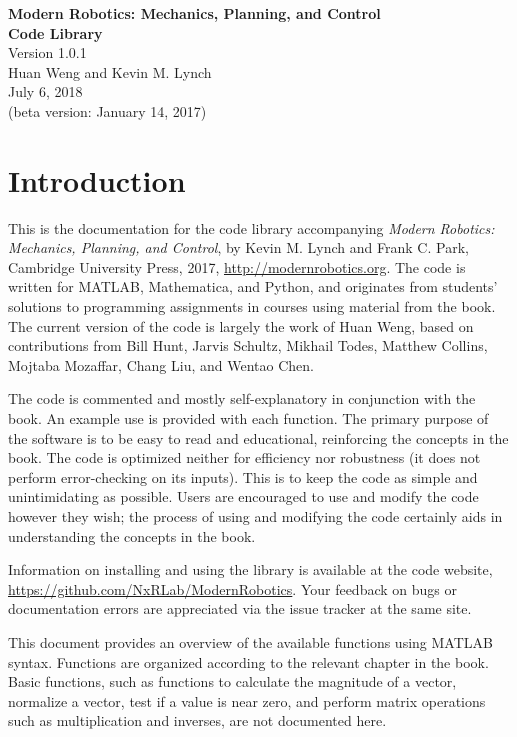 \documentclass[11pt]{article}
\begin{document}
\begin{center}			%
\Large
{\bf Modern Robotics:  Mechanics, Planning, and Control} \\
{\bf Code Library} \\
\normalsize
Version 1.0.1\\
\vspace*{0.2in}
Huan Weng and Kevin M. Lynch \\
July 6, 2018 \\
(beta version:  January 14, 2017)
\end{center}

\section*{Introduction}			

This is the documentation for the code library accompanying \emph{Modern Robotics:  Mechanics, Planning, and Control}, by Kevin M. Lynch and Frank C. Park, Cambridge University Press, 2017, \url{http://modernrobotics.org}.  The code is written for MATLAB, Mathematica, and Python, and originates from students' solutions to programming assignments in courses using material from the book.  The current version of the code is largely the work of Huan Weng, based on contributions from Bill Hunt, Jarvis Schultz, Mikhail Todes, Matthew Collins, Mojtaba Mozaffar, Chang Liu, and Wentao Chen.  

The code is commented and mostly self-explanatory in conjunction with the book.  An example use is provided with each function.  The primary purpose of the software is to be easy to read and educational, reinforcing the concepts in the book.  The code is optimized neither for efficiency nor robustness (it does not perform error-checking on its inputs).  This is to keep the code as simple and unintimidating as possible.  Users are encouraged to use and modify the code however they wish; the process of using and modifying the code certainly aids in understanding the concepts in the book.

Information on installing and using the library is available at the code website, \url{https://github.com/NxRLab/ModernRobotics}.  Your feedback on bugs or documentation errors are appreciated via the issue tracker at the same site.

This document provides an overview of the available functions using MATLAB syntax.  Functions are organized according to the relevant chapter in the book.  Basic functions, such as functions to calculate the magnitude of a vector, normalize a vector, test if a value is near zero, and perform matrix operations such as multiplication and inverses, are not documented here.
\end{document}
